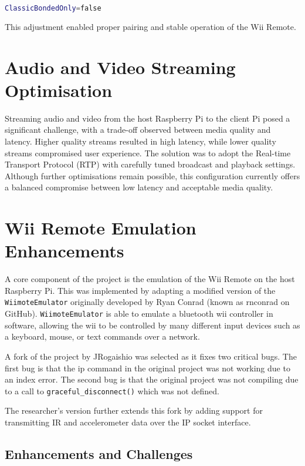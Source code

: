 \begin{lstlisting}[language=bash]
ClassicBondedOnly=false
\end{lstlisting}

This adjustment enabled proper pairing and stable operation of the Wii Remote.

\section{Audio and Video Streaming Optimisation}
Streaming audio and video from the host Raspberry Pi to the client Pi posed a significant challenge, with a trade-off observed between media quality and latency. Higher quality streams resulted in high latency, while lower quality streams compromised user experience. The solution was to adopt the Real-time Transport Protocol (RTP) with carefully tuned broadcast and playback settings. Although further optimisations remain possible, this configuration currently offers a balanced compromise between low latency and acceptable media quality.


\section{Wii Remote Emulation Enhancements}

A core component of the project is the emulation of the Wii Remote on the host Raspberry Pi. This was implemented by adapting a modified version of the \texttt{WiimoteEmulator} originally developed by Ryan Conrad\cite{wiimote_emulator} (known as rnconrad on GitHub). \texttt{WiimoteEmulator} is able to emulate a bluetooth wii controller in software, allowing the wii to be controlled by many different input devices such as a keyboard, mouse, or text commands over a network.

A fork of the project by JRogaishio\cite{jr_wiimote_emu} was selected as it fixes two critical bugs. The first
bug is that the ip command in the original project was not working due to an index error. The second bug is that the original project was not compiling due to a call to \texttt{graceful\_disconnect()} which was not defined.

The researcher's version\cite{kf_wiimote_emu} further extends this fork by adding support for transmitting IR and accelerometer data over the IP socket interface.

\subsection*{Enhancements and Challenges}


